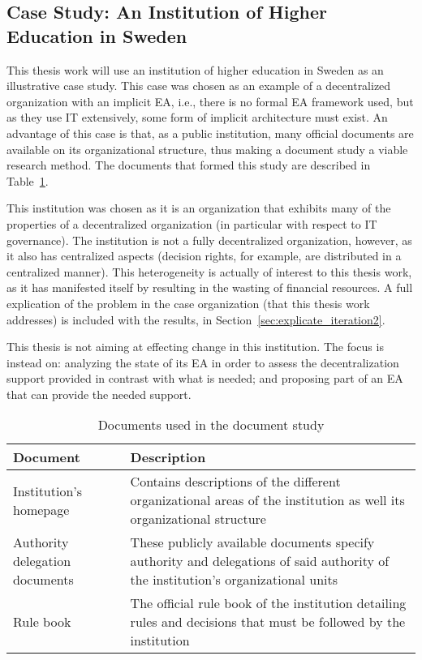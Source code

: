 \subsection{Case Study: An Institution of Higher Education in Sweden}
\label{sec:case}

This thesis work will use an institution of higher education in Sweden as an illustrative case study. This case was chosen as an example of a decentralized organization with an implicit EA, i.e., there is no formal EA framework used, but as they use IT extensively, some form of implicit architecture must exist. An advantage of this case is that, as a public institution, many official documents are available on its organizational structure, thus making a document study a viable research method. The documents that formed this study are described in Table~\ref{tab:doc_study}.

This institution was chosen as it is an organization that exhibits many of the properties of a decentralized organization (in particular with respect to IT governance). The institution is not a fully decentralized organization, however, as it also has centralized aspects (decision rights, for example, are distributed in a centralized manner). This heterogeneity is actually of interest to this thesis work, as it has manifested itself by resulting in the wasting of financial resources. A full explication of the problem in the case organization (that this thesis work addresses) is included with the results, in Section~\ref{sec:explicate_iteration2}.

This thesis is not aiming at effecting change in this institution. The focus is instead on: analyzing the state of its EA in order to assess the decentralization support provided in contrast with what is needed; and proposing part of an EA that can provide the needed support. 

\begin{table}  
  \begin{tabular}[c]{| p{} |
                       p{} | }
    \hline
    \textbf{Document} & \textbf{Description} \\
    \hline
    Institution's homepage & Contains descriptions of the different organizational areas of the institution as well its organizational structure \\
    \hline
    Authority delegation documents & These publicly available documents specify authority and delegations of said authority of the institution's organizational units \\
    \hline
    Rule book & The official rule book of the institution detailing rules and decisions that must be followed by the institution \\
    \hline
  \end{tabular}
  \caption{Documents used in the document study}
  \label{tab:doc_study}
\end{table}

